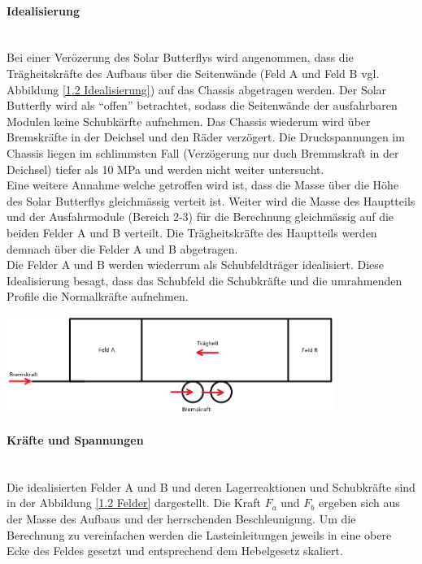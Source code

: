  \paragraph{Idealisierung}\mbox{}\\
  Bei einer Verözerung des Solar Butterflys wird angenommen, dass die Trägheitskräfte des Aufbaus über die Seitenwände (Feld A und Feld B vgl. Abbildung \ref{1.2 Idealisierung}) auf das Chassis abgetragen werden. Der Solar Butterfly wird als ``offen'' betrachtet, sodass die Seitenwände der ausfahrbaren Modulen keine Schubkärfte aufnehmen. Das Chassis wiederum wird über Bremskräfte in der Deichsel und den Räder verzögert. Die Druckspannungen im Chassis liegen im schlimmsten Fall (Verzögerung nur duch Bremmskraft in der Deichsel) tiefer als 10 MPa und werden nicht weiter untersucht.\\
  Eine weitere Annahme welche getroffen wird ist, dass die Masse über die Höhe des Solar Butterflys gleichmässig verteit ist. Weiter wird die Masse des Hauptteils und der Ausfahrmodule (Bereich 2-3) für die Berechnung gleichmässig auf die beiden Felder A und B verteilt. Die Trägheitskräfte des Hauptteils werden demnach über die Felder A und B abgetragen.\\
  Die Felder A und B werden wiederrum als Schubfeldträger idealisiert. Diese Idealisierung besagt, dass das Schubfeld die Schubkräfte und die umrahmenden Profile die Normalkräfte aufnehmen.

  \begin{center}
    \includegraphics[width=0.8\textwidth]{04_Figures/1.2 Idealisierung.png}
    \label{1.2 Idealisierung}
  \end{center}

  \paragraph{Kräfte und Spannungen}\mbox{}\\
  Die idealisierten Felder A und B und deren Lagerreaktionen und Schubkräfte sind in der Abbildung \ref{1.2 Felder} dargestellt. Die Kraft $F_a$ und $F_b$ ergeben sich aus der Masse des Aufbaus und der herrschenden Beschleunigung. Um die Berechnung zu vereinfachen werden die Lasteinleitungen jeweils in eine obere Ecke des Feldes gesetzt und entsprechend dem Hebelgesetz skaliert.

